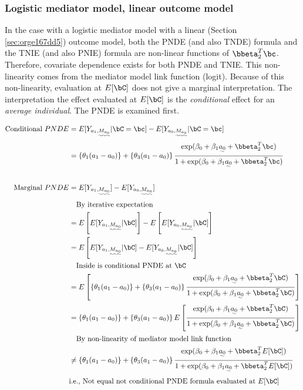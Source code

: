 \documentclass[10pt]{article}
\begin{document}
\subsubsection{Logistic mediator model, linear outcome model}
\label{sec:org91e945f}
In the case with a logistic mediator model with a linear (Section \ref{sec:orge167dd5}) outcome model, both the PNDE (and also TNDE) formula and the TNIE (and also PNIE) formula are non-linear functions of \(\bbeta_{2}^{T}\bc\). Therefore, covariate dependence exists for both PNDE and TNIE. This non-linearity comes from the mediator model link function (logit). Because of this non-linearity, evaluation at \(E[\bC]\) does not give a marginal interpretation. The interpretation the effect evaluated at \(E[\bC]\) is the \emph{conditional} effect for an \emph{average individual}. The PNDE is examined first.

\begin{align*}
  \text{Conditional }PNDE
  &= E[Y_{a_{1},\uwave{M_{a_{0}}}} | \bC = \bc] - E[Y_{a_{0},\uwave{M_{a_{0}}}} | \bC = \bc]\\
  &= \left\{\theta_{1}(a_{1} - a_{0}) \right\} + \left\{\theta_{3}(a_{1} - a_{0}) \right\}
    \frac
    {    \exp(\beta_{0} + \beta_{1}\uwave{a_{0}} + \bbeta_{2}^{T}\bc)}
    {1 + \exp(\beta_{0} + \beta_{1}\uwave{a_{0}} + \bbeta_{2}^{T}\bc)}\\
  \\
  \text{Marginal }PNDE
  &= E[Y_{a_{1},\uwave{M_{a_{0}}}}] - E[Y_{a_{0},\uwave{M_{a_{0}}}}]\\
  &~~~\text{By iterative expectation}\\
  &= E \left[ E[Y_{a_{1},\uwave{M_{a_{0}}}} | \bC] \right] - E \left[ E[Y_{a_{0},\uwave{M_{a_{0}}}} | \bC] \right]\\
  &= E \left[ E[Y_{a_{1},\uwave{M_{a_{0}}}} | \bC] - E[Y_{a_{0},\uwave{M_{a_{0}}}} | \bC] \right]\\
  &~~~\text{Inside is conditional PNDE at }\bC\\
  &= E \left[ \left\{\theta_{1}(a_{1} - a_{0}) \right\} + \left\{\theta_{3}(a_{1} - a_{0}) \right\}
    \frac
    {    \exp(\beta_{0} + \beta_{1}\uwave{a_{0}} + \bbeta_{2}^{T}\bC)}
    {1 + \exp(\beta_{0} + \beta_{1}\uwave{a_{0}} + \bbeta_{2}^{T}\bC)} \right]\\
  &= \left\{\theta_{1}(a_{1} - a_{0}) \right\} + \left\{\theta_{3}(a_{1} - a_{0}) \right\}
    E \left[ \frac
    {    \exp(\beta_{0} + \beta_{1}\uwave{a_{0}} + \bbeta_{2}^{T}\bC)}
    {1 + \exp(\beta_{0} + \beta_{1}\uwave{a_{0}} + \bbeta_{2}^{T}\bC)} \right]\\
  &~~~\text{By non-linearity of mediator model link function}\\
  &\ne \left\{\theta_{1}(a_{1} - a_{0}) \right\} + \left\{\theta_{3}(a_{1} - a_{0}) \right\}
    \frac
    {    \exp(\beta_{0} + \beta_{1}\uwave{a_{0}} + \bbeta_{2}^{T}E[\bC])}
    {1 + \exp(\beta_{0} + \beta_{1}\uwave{a_{0}} + \bbeta_{2}^{T}E[\bC])}\\
  &\text{i.e., Not equal not conditional PNDE formula evaluated at }E[\bC]\\
\end{align*}
\end{document}
